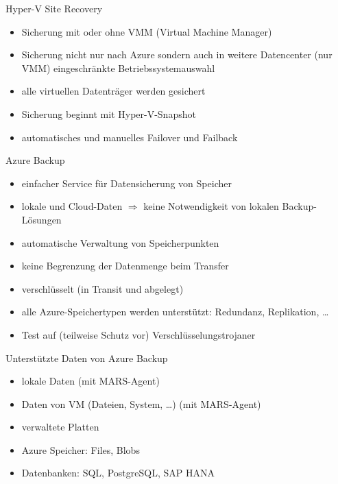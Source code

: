 \begin{flashcard}[Definition]{Hyper-V Site Recovery}
  \begin{itemize}
    \item Sicherung mit oder ohne VMM (Virtual Machine Manager)
    \item Sicherung nicht nur nach Azure sondern auch in weitere Datencenter (nur VMM)\newline
      eingeschränkte Betriebssystemauswahl
    \item alle virtuellen Datenträger werden gesichert
    \item Sicherung beginnt mit Hyper-V-Snapshot
    \item automatisches und manuelles Failover und Failback
  \end{itemize}
\end{flashcard}

\begin{flashcard}[Definition]{Azure Backup}
  \begin{itemize}
    \item einfacher Service für Datensicherung von Speicher
    \item lokale und Cloud-Daten\newline
      $\Rightarrow$ keine Notwendigkeit von lokalen Backup-Lösungen
    \item automatische Verwaltung von Speicherpunkten
    \item keine Begrenzung der Datenmenge beim Transfer
    \item verschlüsselt (in Transit und abgelegt)
    \item alle Azure-Speichertypen werden unterstützt: Redundanz, Replikation, \ldots
    \item Test auf (teilweise Schutz vor) Verschlüsselungstrojaner
  \end{itemize}
\end{flashcard}

\begin{flashcard}[Definition]{Unterstützte Daten von Azure Backup}
  \begin{itemize}
    \item lokale Daten (mit MARS-Agent)
    \item Daten von VM (Dateien, System, \ldots) (mit MARS-Agent)
    \item verwaltete Platten
    \item Azure Speicher: Files, Blobs
    \item Datenbanken: SQL, PostgreSQL, SAP HANA
  \end{itemize}
\end{flashcard}

